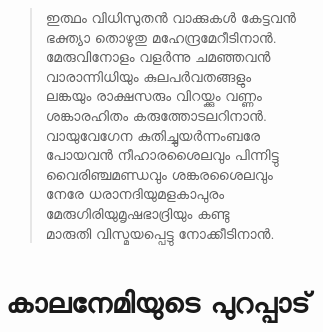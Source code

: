 \begin{verse}
ഇത്ഥം വിധിസുതന്‍ വാക്കുകള്‍ കേട്ടവന്‍\\
ഭക്ത്യാ തൊഴുതു മഹേന്ദ്രമേറീടിനാന്‍.\\
മേരുവിനോളം വളര്‍ന്നു ചമഞ്ഞവന്‍\\
വാരാന്നിധിയും കുലപര്‍വതങ്ങളും\\
ലങ്കയും രാക്ഷസരും വിറയ്ക്കും വണ്ണം\\
ശങ്കാരഹിതം കരുത്തോടലറിനാന്‍.\\
വായുവേഗേന കുതിച്ചുയര്‍ന്നംബരേ\\
പോയവന്‍ നീഹാരശൈലവും പിന്നിട്ടു\\
വൈരിഞ്ചമണ്ഡവും ശങ്കരശൈലവും\\
നേരേ ധരാനദിയുമളകാപുരം\\
മേരുഗിരിയുമൃഷഭാദ്രിയും കണ്ടു\\
മാരുതി വിസ്മയപ്പെട്ടു നോക്കീടിനാന്‍.
\end{verse}


\section{കാലനേമിയുടെ പുറപ്പാട്}

